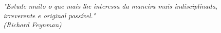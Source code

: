 \begin{epigrafe}
    \vspace*{\fill}
	\begin{flushright}
		\textit{"Estude muito o que mais lhe interessa da maneira mais indisciplinada, irreverente e original possível." \\
        (Richard Feynman)}
	\end{flushright}
\end{epigrafe}